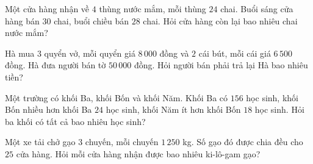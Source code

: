 

\begin{bt}%
	Một cửa hàng nhận về $4$ thùng nước mắm, mỗi thùng $24$ chai. Buổi sáng cửa hàng bán $30$ chai, buổi chiều bán $28$ chai. Hỏi cửa hàng còn lại bao nhiêu chai nước mắm?
\end{bt}

\begin{bt}%
	Hà mua $3$ quyển vở, mỗi quyển giá $8\,000$ đồng và $2$ cái bút, mỗi cái giá $6\,500$ đồng. Hà đưa người bán tờ $50\,000$ đồng. Hỏi người bán phải trả lại Hà bao nhiêu tiền?
\end{bt}

\begin{bt}%
	Một trường có khối Ba, khối Bốn và khối Năm. Khối Ba có $156$ học sinh, khối Bốn nhiều hơn khối Ba $24$ học sinh, khối Năm ít hơn khối Bốn $18$ học sinh. Hỏi ba khối có tất cả bao nhiêu học sinh?
\end{bt}

\begin{bt}%
	Một xe tải chở gạo $3$ chuyến, mỗi chuyến $1\,250$ kg. Số gạo đó được chia đều cho $25$ cửa hàng. Hỏi mỗi cửa hàng nhận được bao nhiêu ki-lô-gam gạo?
\end{bt}
